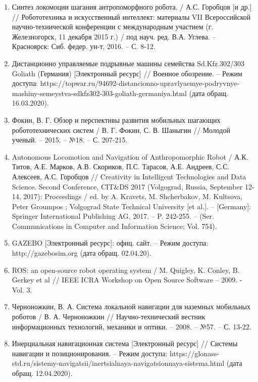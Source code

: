\aftertitle

\begin{enumerate}[label={\arabic*.},labelsep=2.4em,itemindent=0pt,leftmargin=*,align=right]
	\item Синтез локомоции шагания антропоморфного робота. / А.С. Горобцов [и др.] // Робототехника и искусственный интеллект: материалы VII Всероссийской научно-технической конференции с международным участием (г. Железногорск, 11 декабря 2015 г.) / под науч. ред. В.А. Углева. – Красноярск: Сиб. федер. ун-т, 2016. – С. 8-12.
	\item Дистанционно управляемые подрывные машины семейства Sd.Kfz.302/303 Goliath (Германия) [Электронный ресурс] // Военное обозрение. – Режим доступа: https://topwar.ru/94692-distancionno-upravlyaemye-podryvnye-mashiny-semeystva-sdkfz302-303-goliath-germaniya.html (дата обращ. 16.03.2020).
	\item Фокин, В. Г. Обзор и перспективы развития мобильных шагающих робототехнических систем / В. Г. Фокин, С. В. Шаныгин // Молодой ученый. – 2015. – №18. – С. 207-215.
	\item Autonomous Locomotion and Navigation of Anthropomorphic Robot / А.К. Титов, А.Е. Марков, А.В. Скориков, П.С. Тарасов, А.Е. Андреев, С.С. Алексеев, А.С. Горобцов // Creativity in Intelligent Technologies and Data Science. Second Conference, CIT\&DS 2017 (Volgograd, Russia, September 12-14, 2017): Proceedings / ed. by A. Kravets, M. Shcherbakov, M. Kultsova, Peter Groumpos ; Volgograd State Technical University [et al.]. – [Germany]: Springer International Publishing AG, 2017. – P. 242-255. – (Ser. Communications in Computer and Information Science; Vol. 754).
	\item GAZEBO [Электронный ресурс]: офиц. сайт. – Режим доступа: http://gazebosim.org (дата обращ. 02.04.20).
	\item ROS: an open-source robot operating system / M. Quigley, K. Conley, B. Gerkey et al // IEEE ICRA Workshop on Open Source Software – 2009. - Vol. 3.
	\item Черноножкин, В. А. Система локальной навигации для наземных мобильных роботов / В. А. Черноножкин // Научно-технический вестник информационных технологий, механики и оптики. – 2008. – №57. – С. 13-22.
	\item Инерциальная навигационная система [Электронный ресурс] // Системы навигации и позиционирования. – Режим доступа: https://glonass-std.ru/sistemy-navigatsii/inertsialnaya-navigatsionnaya-sistema.html (дата обращ. 12.04.2020).

\end{enumerate}
